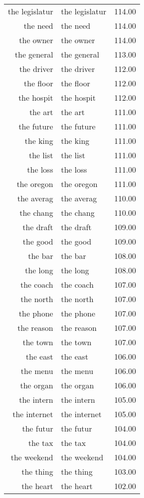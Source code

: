 \begin{table}[ht]
\begin{tabular}{rlr}
  the legislatur & the legislatur & 114.00 \\ 
  the need & the need & 114.00 \\ 
  the owner & the owner & 114.00 \\ 
  the general & the general & 113.00 \\ 
  the driver & the driver & 112.00 \\ 
  the floor & the floor & 112.00 \\ 
  the hospit & the hospit & 112.00 \\ 
  the art & the art & 111.00 \\ 
  the future & the future & 111.00 \\ 
  the king & the king & 111.00 \\ 
  the list & the list & 111.00 \\ 
  the loss & the loss & 111.00 \\ 
  the oregon & the oregon & 111.00 \\ 
  the averag & the averag & 110.00 \\ 
  the chang & the chang & 110.00 \\ 
  the draft & the draft & 109.00 \\ 
  the good & the good & 109.00 \\ 
  the bar & the bar & 108.00 \\ 
  the long & the long & 108.00 \\ 
  the coach & the coach & 107.00 \\ 
  the north & the north & 107.00 \\ 
  the phone & the phone & 107.00 \\ 
  the reason & the reason & 107.00 \\ 
  the town & the town & 107.00 \\ 
  the east & the east & 106.00 \\ 
  the menu & the menu & 106.00 \\ 
  the organ & the organ & 106.00 \\ 
  the intern & the intern & 105.00 \\ 
  the internet & the internet & 105.00 \\ 
  the futur & the futur & 104.00 \\ 
  the tax & the tax & 104.00 \\ 
  the weekend & the weekend & 104.00 \\ 
  the thing & the thing & 103.00 \\ 
  the heart & the heart & 102.00 \\ 

\end{tabular}
\end{table}
